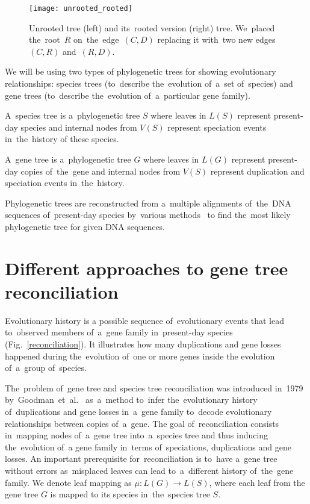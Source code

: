 \begin{figure}[ht!]
	\centering
	\label{unrooted_rooted}
  	\texttt{[image: unrooted\_rooted]}
  	\caption[Unrooted tree and its~rooted version]{Unrooted tree (left) and its~rooted version (right) tree. We~placed the~root~$R$ on~the~edge~$(C, D)$ replacing it with~two new edges~$(C, R)$ and~$(R, D)$.}
\end{figure}

We will be using two types of phylogenetic trees for showing evolutionary relationships: species trees (to~describe the~evolution of~a~set of~species) and gene trees (to~describe the~evolution of~a~particular gene family).

A~species tree is a~phylogenetic tree $S$ where leaves in $L(S)$ represent present-day species and internal nodes from $V(S)$ represent speciation events in~the~history of these species.

A~gene tree is a~phylogenetic tree $G$ where leaves in $L(G)$ represent present-day copies of~the~gene and internal nodes from $V(S)$ represent duplication and speciation events in~the~history.

Phylogenetic trees are reconstructed from a~multiple alignments of~the~DNA sequences of~present-day species by~various methods~\cite{felsenstein} to find the~most likely phylogenetic tree for given DNA sequences.

\section{Different approaches to gene tree reconciliation} \label{different_approaches}
Evolutionary history is a possible sequence of~evolutionary events that lead to~observed members of~a~gene family in~present-day species (Fig.~\ref{reconciliation}). It illustrates how many duplications and gene losses happened during the~evolution of~one or more genes inside the evolution of~a~group of~species.

The~problem of~gene tree and species tree reconciliation was introduced in~1979 by~Goodman~et~al.~\cite{goodman} as~a~method to~infer the~evolutionary history of~duplications and gene losses in~a~gene family to~decode evolutionary relationships between copies of~a~gene. The goal of~reconciliation consists in~mapping nodes of~a~gene tree into~a~species tree and thus inducing the~evolution of~a gene family in~terms of~speciations, duplications and gene losses. An important prerequisite for~reconciliation is to~have a~gene tree without errors as~misplaced leaves can lead to~a~different history of~the~gene family.
We denote leaf mapping as $\mu: L(G) \rightarrow L(S)$, where each leaf from the gene tree $G$ is mapped to its species in~the~species tree $S$.

